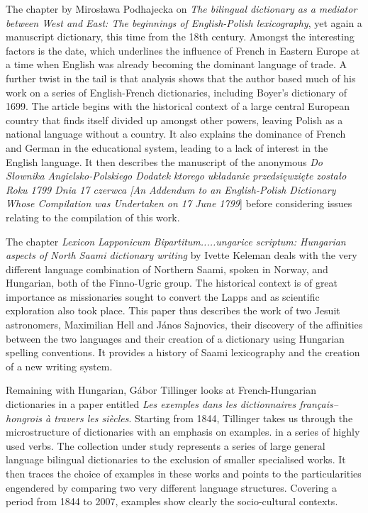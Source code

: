 \documentclass[output=paper]{langscibook}
\begin{document}
The chapter by Mirosława Podhajecka on \textit{The bilingual dictionary as a mediator between West and East: The beginnings of English-Polish lexicography},  yet again a manuscript dictionary, this time from the 18th century. Amongst the interesting factors is the date, which underlines the influence of French in Eastern Europe at a time when English was already becoming the dominant language of trade. A further twist in the tail is that analysis shows that the author based much of his work on a series of English-French dictionaries, including Boyer's dictionary of 1699. The article begins with the historical context of a large central European country that finds itself divided up amongst other powers, leaving Polish as a national language without a country. It also explains the dominance of French and German in the educational system, leading to a lack of interest in the English language. It then describes the manuscript of the anonymous \textit{Do Słownika Angielsko-Polskiego Dodatek ktorego układanie przedsięwzięte zostało Roku 1799  Dnia 17 czerwca [An Addendum to an English-Polish Dictionary Whose Compilation was Undertaken on 17 June 1799}] before considering issues relating to the compilation of this work.

The chapter \textit{Lexicon Lapponicum Bipartitum.....ungarice scriptum: Hungarian aspects of North Saami dictionary writing} by Ivette Keleman deals with the very different language combination of Northern Saami, spoken in Norway, and Hungarian, both of the Finno-Ugric group. The historical context is of great importance as missionaries sought to convert the Lapps and as scientific exploration also took place. This paper thus describes the work of two Jesuit astronomers, Maximilian Hell and János Sajnovics, their discovery of the affinities between the two languages and their creation of a dictionary using Hungarian spelling conventions. It provides a history of Saami lexicography and the creation of a new writing system.

Remaining with Hungarian, Gábor Tillinger looks at French-Hungarian dictionaries in a paper entitled \textit{Les exemples dans les dictionnaires français–hongrois à travers les siècles}. Starting from 1844, Tillinger takes us through the microstructure of dictionaries with an emphasis on examples. in a series of highly used verbs. The collection under study represents a series of large general language bilingual dictionaries to the exclusion of smaller specialised works. It then traces the choice of examples in these works and points to the particularities engendered by comparing two very different language structures. Covering a period from 1844 to 2007, examples show clearly the socio-cultural contexts.
\end{document}
